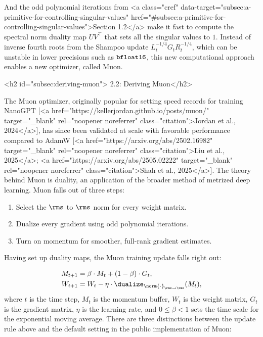 And the odd polynomial iterations from <a class="cref" data-target="subsec:a-primitive-for-controlling-singular-values" href="#subsec:a-primitive-for-controlling-singular-values">Section 1.2</a> make it fast to compute the spectral norm duality map $UV^\top$ that sets all the singular values to $1$. Instead of inverse fourth roots from the Shampoo update $L_t^{-1/4} G_t R_t^{-1/4}$, which can be unstable in lower precisions such as $\verb|bfloat16|$, this new computational approach enables a new optimizer, called Muon.

<h2 id="subsec:deriving-muon"> 2.2: Deriving Muon</h2>

The Muon optimizer, originally popular for setting speed records for training NanoGPT [<a href="https://kellerjordan.github.io/posts/muon/" target="_blank" rel="noopener noreferrer" class="citation">Jordan et al., 2024</a>], has since been validated at scale with favorable performance compared to AdamW [<a href="https://arxiv.org/abs/2502.16982" target="_blank" rel="noopener noreferrer" class="citation">Liu et al., 2025</a>; <a href="https://arxiv.org/abs/2505.02222" target="_blank" rel="noopener noreferrer" class="citation">Shah et al., 2025</a>]. The theory behind Muon is duality, an application of the broader method of metrized deep learning. Muon falls out of three steps:

\begin{enumerate}
    \item Select the $\rms$ to $\rms$ norm for every weight matrix.
    \item Dualize every gradient using odd polynomial iterations.
    \item Turn on momentum for smoother, full-rank gradient estimates.
\end{enumerate}

Having set up duality maps, the Muon training update falls right out:

\begin{align}
    M_{t+1} &= \beta \cdot M_t + (1 - \beta) \cdot G_t, \\
    W_{t+1} &= W_t - \eta \cdot \dualize_{\norm{\cdot}_{\rms \to \rms}}(M_t),
\end{align}
where $t$ is the time step, $M_t$ is the momentum buffer, $W_t$ is the weight matrix, $G_t$ is the gradient matrix,  $\eta$ is the learning rate, and $0 \leq \beta < 1$ sets the time scale for the exponential moving average. There are three distinctions between the update rule above and the default setting in the public implementation of Muon:

